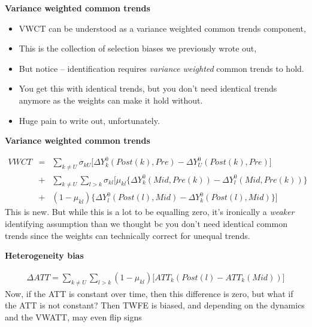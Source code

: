 \documentclass[notes=show]{beamer}
\begin{document}
\begin{frame}[plain]
\begin{center}
\textbf{Variance weighted common trends}
\end{center}

\begin{itemize}
\item VWCT can be understood as a variance weighted common trends component, 
\item This is the collection of selection biases we previously wrote out, 
\item But notice -- identification requires \emph{variance weighted} common trends to hold. 
\item You get this with identical trends, but you don't need identical trends anymore as the weights can make it hold without. 
\item Huge pain to write out, unfortunately.
\end{itemize}


\end{frame}

\begin{frame}[plain]
\begin{center}
\textbf{Variance weighted common trends}
\end{center}

\begin{eqnarray*}
VWCT &=& \sum_{k \neq U} \sigma_{kU} \bigg [ \Delta Y_k^0(Post(k),Pre) - \Delta Y_U^0(Post(k),Pre) \bigg ] \\
&+& \sum_{k \neq U} \sum_{l>k} \sigma_{kl} \bigg [ \mu_{kl} \{ \Delta Y^0_k(Mid,Pre(k)) - \Delta Y_l^0(Mid,Pre(k))\} \\
&+&(1-\mu_{kl}) \{ \Delta Y^0_l(Post(l), Mid) - \Delta Y^0_k(Post(l), Mid) \} \bigg ]
\end{eqnarray*}This is new. But while this is a lot to be equalling zero, it's ironically a \emph{weaker} identifying assumption than we thought bc you don't need identical common trends since the weights can technically correct for unequal trends. 

\end{frame}

\begin{frame}[plain]
\begin{center}
\textbf{Heterogeneity bias}
\end{center}

\begin{eqnarray*}
\Delta ATT = \sum_{k \neq U} \sum_{l>k} (1 - \mu_{kl}) \bigg [ ATT_k(Post(l) - ATT_k(Mid)) \bigg ]
\end{eqnarray*}Now, if the ATT is constant over time, then this difference is zero, but what if the ATT is not constant? Then TWFE is biased, and depending on the dynamics and the VWATT, may even flip signs
\end{frame}
\end{document}
